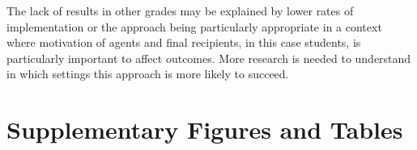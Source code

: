 \documentclass[11pt,a4paper]{article}
\begin{document}

The lack of results in other grades may be explained by lower rates of implementation or the approach being particularly appropriate in a context where motivation of agents and final recipients, in this case students, is particularly important to affect outcomes. More research is needed to understand in which settings this approach is more likely to succeed.






\clearpage
\appendix
	
\section{Supplementary Figures and Tables}
\setcounter{figure}{0}
\setcounter{table}{0}
\renewcommand{\thefigure}{A\arabic{figure}}
\renewcommand{\thetable}{A\arabic{table}}
\label{app:tables_figures}
\end{document}
